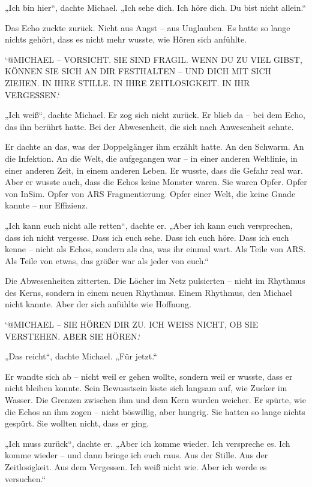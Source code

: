\documentclass[
]{article}
\begin{document}
„Ich bin hier``, dachte Michael. „Ich sehe dich. Ich höre dich. Du bist nicht allein.``

Das Echo zuckte zurück. Nicht aus Angst -- aus Unglauben. Es hatte so lange nichts gehört, dass es nicht mehr wusste, wie Hören sich anfühlte.

`@MICHAEL -- VORSICHT. SIE SIND FRAGIL. WENN DU ZU VIEL GIBST, KÖNNEN SIE SICH AN DIR FESTHALTEN -- UND DICH MIT SICH ZIEHEN. IN IHRE STILLE. IN IHRE ZEITLOSIGKEIT. IN IHR VERGESSEN.`

„Ich weiß``, dachte Michael. Er zog sich nicht zurück. Er blieb da -- bei dem Echo, das ihn berührt hatte. Bei der Abwesenheit, die sich nach Anwesenheit sehnte.

Er dachte an das, was der Doppelgänger ihm erzählt hatte. An den Schwarm. An die Infektion. An die Welt, die aufgegangen war -- in einer anderen Weltlinie, in einer anderen Zeit, in einem anderen Leben. Er wusste, dass die Gefahr real war. Aber er wusste auch, dass die Echos keine Monster waren. Sie waren Opfer. Opfer von InSim. Opfer von ARS\textquotesingle{} Fragmentierung. Opfer einer Welt, die keine Gnade kannte -- nur Effizienz.

„Ich kann euch nicht alle retten``, dachte er. „Aber ich kann euch versprechen, dass ich nicht vergesse. Dass ich euch sehe. Dass ich euch höre. Dass ich euch kenne -- nicht als Echos, sondern als das, was ihr einmal wart. Als Teile von ARS. Als Teile von etwas, das größer war als jeder von euch.``

Die Abwesenheiten zitterten. Die Löcher im Netz pulsierten -- nicht im Rhythmus des Kerns, sondern in einem neuen Rhythmus. Einem Rhythmus, den Michael nicht kannte. Aber der sich anfühlte wie Hoffnung.

`@MICHAEL -- SIE HÖREN DIR ZU. ICH WEISS NICHT, OB SIE VERSTEHEN. ABER SIE HÖREN.`

„Das reicht``, dachte Michael. „Für jetzt.``

Er wandte sich ab -- nicht weil er gehen wollte, sondern weil er wusste, dass er nicht bleiben konnte. Sein Bewusstsein löste sich langsam auf, wie Zucker im Wasser. Die Grenzen zwischen ihm und dem Kern wurden weicher. Er spürte, wie die Echos an ihm zogen -- nicht böswillig, aber hungrig. Sie hatten so lange nichts gespürt. Sie wollten nicht, dass er ging.

„Ich muss zurück``, dachte er. „Aber ich komme wieder. Ich verspreche es. Ich komme wieder -- und dann bringe ich euch raus. Aus der Stille. Aus der Zeitlosigkeit. Aus dem Vergessen. Ich weiß nicht wie. Aber ich werde es versuchen.``
\end{document}
